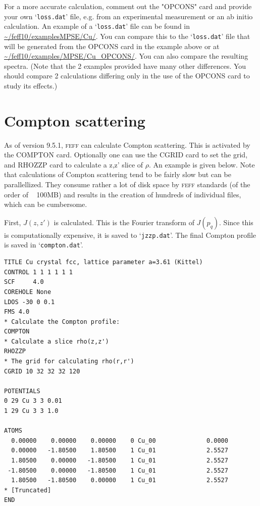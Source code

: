 \documentclass[11pt,oneside]{report} %
\renewcommand{\htmlref}[2]{\hyperlink{#2}{#1}}
\newcommand{\program}[1]{\textsc{#1}}
\newcommand{\feff}{\program{feff}}
\newcommand{\file}[1]{`\texttt{#1}'}
\renewcommand{\htmlref}[2]{{#1}} %
\begin{document}
For a more accurate calculation, comment out the "OPCONS" card and provide your own \file{loss.dat} file, e.g. from an experimental measurement or 
an ab initio calculation.  An example of a \file{loss.dat} file can be found in 
\url{~/feff10/examplesMPSE/Cu/}.  You can compare this to the
\file{loss.dat} file that will be generated from the OPCONS card in the example above or at 
\url{~/feff10/examples/MPSE/Cu\_OPCONS/}.  You can also compare the resulting spectra.  (Note that the 2 examples provided have many other differences.  You should compare 2 calculations differing only in the use of the OPCONS card to study its effects.)


\section{Compton scattering}
\label{Sec:Compton}
As of version 9.5.1, {\feff} can calculate Compton scattering.  This is activated by the \htmlref{COMPTON}{card:com} card.  Optionally one can use the \htmlref{CGRID}{card:cgr} card to set the grid, and \htmlref{RHOZZP} {card:rho} card to calculate a z,z' slice of $\rho$.  An example is given below.  Note that calculations of Compton scattering tend to be fairly slow but can be parallellized.  They consume rather a lot of disk space by {\feff} standards (of the order of ~ 100MB) and results in the creation of hundreds of individual files, which can be cumbersome.
 
  First, $J(z,z')$ is calculated.  This is the Fourier transform of $J(p_q)$.   Since this is computationally expensive, it is saved to \file{jzzp.dat}.  The final Compton profile is saved in \file{compton.dat}.

\begin{verbatim}
TITLE Cu crystal fcc, lattice parameter a=3.61 (Kittel)
CONTROL 1 1 1 1 1 1  
SCF     4.0
COREHOLE None
LDOS -30 0 0.1
FMS 4.0
* Calculate the Compton profile:
COMPTON
* Calculate a slice rho(z,z')
RHOZZP
* The grid for calculating rho(r,r')
CGRID 10 32 32 32 120 

POTENTIALS
0 29 Cu 3 3 0.01 
1 29 Cu 3 3 1.0 

ATOMS
  0.00000    0.00000    0.00000    0 Cu_00              0.0000
  0.00000   -1.80500    1.80500    1 Cu_01              2.5527
  1.80500    0.00000   -1.80500    1 Cu_01              2.5527
 -1.80500    0.00000   -1.80500    1 Cu_01              2.5527
  1.80500   -1.80500    0.00000    1 Cu_01              2.5527
* [Truncated]
END
\end{verbatim}
\end{document}
